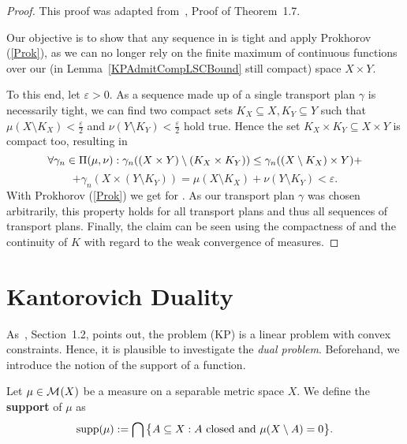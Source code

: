 \begin{proof}
	This proof was adapted from~\cite{San2015}, Proof of Theorem~1.7.

	Our objective is to show that any sequence in \TP{\mu}{\nu} is tight and apply Prokhorov (\ref{Prok}), as we can no longer rely on the finite maximum of continuous functions over our (in Lemma~\ref{KPAdmitCompLSCBound} still compact) space $X \times Y$.

	To this end, let $\varepsilon > 0$. As a sequence made up of a single transport plan $\gamma$ is necessarily tight, we can find two compact sets $K_X \subseteq X, K_Y \subseteq Y$ such that $\mu(X \setminus K_X) < \frac{\varepsilon}{2}$ and $\nu(Y \setminus K_Y) < \frac{\varepsilon}{2}$ hold true. Hence the set $K_X \times K_Y \subseteq X \times Y$ is compact too, resulting in
	\[ \forall \gamma_n \in \Pi(\mu, \nu): \gamma_n((X \times Y) \setminus (K_X \times K_Y)) \le \gamma_n ((X \setminus K_X) \times Y) + \]
	\[ + \gamma_n(X \times (Y \setminus K_Y)) = \mu(X \setminus K_X) + \nu(Y \setminus K_Y) < \varepsilon. \]
	With Prokhorov (\ref{Prok}) we get  for \Ninf. As our transport plan $\gamma$ was chosen arbitrarily, this property holds for all transport plans and thus all sequences of transport plans. Finally, the claim can be seen using the compactness of \TP{\mu}{\nu} and the continuity of $K$ with regard to the weak convergence of measures.
\end{proof}

\section{Kantorovich Duality}\label{KanDual}

As~\cite{San2015}, Section~1.2, points out, the problem (KP) is a linear problem with convex constraints. Hence, it is plausible to investigate the \textit{dual problem}. Beforehand, we introduce the notion of the support of a function.

\begin{definition}\label{Supp}
	Let $\mu \in \mathcal{M}_{}(X)$ be a measure on a separable metric space $X$. We define the \textbf{support} of $\mu$ as
	\[ \text{supp}(\mu) := \bigcap \big\{ A \subseteq X : A \text{ closed and } \mu(X \setminus A) = 0 \big\}. \]
\end{definition}

